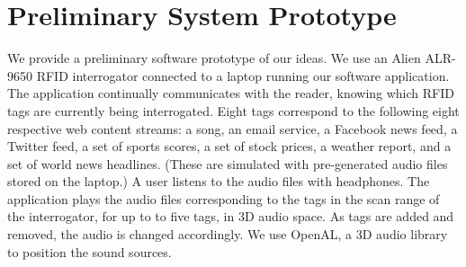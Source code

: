 \documentclass[conference]{IEEEtran}
\begin{document}
\section{Preliminary System Prototype}
We provide a preliminary software prototype of our ideas.  We use an Alien ALR-9650 RFID interrogator connected to a laptop running our software application.  The application continually communicates with the reader, knowing which RFID tags are currently being interrogated.  Eight tags correspond to the following eight respective web content streams:  a song, an email service, a Facebook news feed, a Twitter feed, a set of sports scores, a set of stock prices, a weather report, and a set of world news headlines.  (These are simulated with pre-generated audio files stored on the laptop.)  A user listens to the audio files with headphones.  The application plays the audio files corresponding to the tags in the scan range of the interrogator, for up to to five tags, in 3D audio space.  As tags are added and removed, the audio is changed accordingly.  We use OpenAL, a 3D audio library to position the sound sources.
\end{document}
